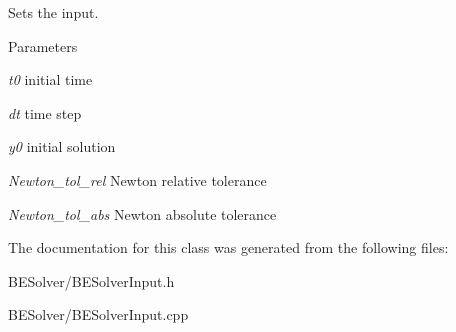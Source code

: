 Sets the input. 
\begin{DoxyParams}{Parameters}
\item[{\em t0}]initial time \item[{\em dt}]time step \item[{\em y0}]initial solution \item[{\em Newton\_\-tol\_\-rel}]Newton relative tolerance \item[{\em Newton\_\-tol\_\-abs}]Newton absolute tolerance \end{DoxyParams}


The documentation for this class was generated from the following files:\begin{DoxyCompactItemize}
\item 
BESolver/BESolverInput.h\item 
BESolver/BESolverInput.cpp\end{DoxyCompactItemize}
